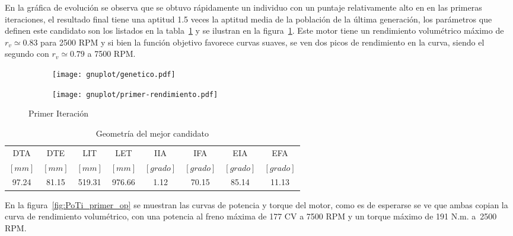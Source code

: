 %

En la gráfica de evolución se observa que se obtuvo rápidamente un individuo con
un puntaje relativamente alto en en las primeras iteraciones, el resultado final
tiene una aptitud 1.5 veces la aptitud media de la población de la última
generación, los parámetros que definen este candidato son los listados en la
tabla~\ref{tab:resultado_primer_it} y se ilustran en la
figura~\ref{fig:primer_op}.
%
Este motor tiene un rendimiento volumétrico máximo de $r_{v} \simeq 0.83$ para 2500
RPM y si bien la función objetivo favorece curvas suaves, se ven dos picos de
rendimiento en la curva, siendo el segundo con $r_{v} \simeq 0.79$ a 7500 RPM.

\begin{figure}[ht]
  \centering
  \begin{subfigure}{.5\textwidth}
    \centering
    \texttt{[image: gnuplot/genetico.pdf]}
  \end{subfigure}%
  \begin{subfigure}{.5\textwidth}
    \centering
    \texttt{[image: gnuplot/primer-rendimiento.pdf]}
  \end{subfigure}
  \caption{Primer Iteración} \label{fig:primer_op}
\end{figure}

\begin{table}
  \centering
  \begin{tabular}{cccccccc} \toprule
    DTA   & DTE   & LIT    & LET    & IIA     & IFA     & EIA     & EFA \\
    $[mm]$  & $[mm]$  & $[mm]$   & $[mm]$   & $[grado]$ & $[grado]$ & $[grado]$ & $[grado]$ \\ \midrule
    97.24 & 81.15 & 519.31 & 976.66 & 1.12    & 70.15   & 85.14   & 11.13 \\ \bottomrule
  \end{tabular}
  \caption{Geometría del mejor candidato}\label{tab:resultado_primer_it}
\end{table}

En la figura~\ref{fig:PoTi_primer_op} se muestran las curvas de potencia y
torque del motor, como es de esperarse se ve que ambas copian la curva de
rendimiento volumétrico, con una potencia al freno máxima de 177 CV a 7500 RPM y
un torque máximo de 191 N.m. a\ 2500 RPM.

